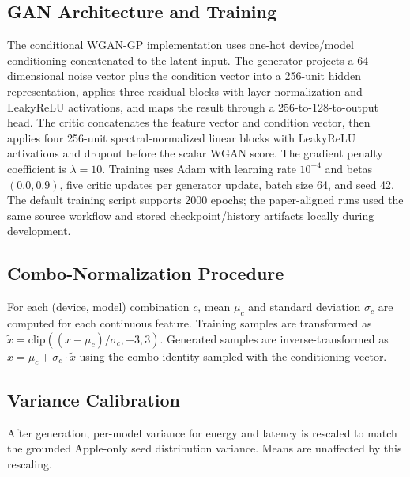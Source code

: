 \documentclass{svproc}
\begin{document}
\subsection{GAN Architecture and Training}
The conditional WGAN-GP implementation uses one-hot device/model conditioning
concatenated to the latent input. The generator projects a 64-dimensional noise
vector plus the condition vector into a 256-unit hidden representation, applies
three residual blocks with layer normalization and LeakyReLU activations, and
maps the result through a 256-to-128-to-output head. The critic concatenates
the feature vector and condition vector, then applies four 256-unit
spectral-normalized linear blocks with LeakyReLU activations and dropout before
the scalar WGAN score. The gradient penalty coefficient is $\lambda = 10$.
Training uses Adam with learning rate $10^{-4}$ and betas $(0.0, 0.9)$, five
critic updates per generator update, batch size 64, and seed 42. The default
training script supports 2000 epochs; the paper-aligned runs used the same
source workflow and stored checkpoint/history artifacts locally during
development.

\subsection{Combo-Normalization Procedure}
For each (device, model) combination $c$, mean $\mu_c$ and standard deviation
$\sigma_c$ are computed for each continuous feature. Training samples are
transformed as $\tilde{x} = \mathrm{clip}((x - \mu_c)/\sigma_c, -3, 3)$.
Generated samples are inverse-transformed as $x = \mu_c + \sigma_c \cdot \tilde{x}$
using the combo identity sampled with the conditioning vector.

\subsection{Variance Calibration}
After generation, per-model variance for energy and latency is rescaled to
match the grounded Apple-only seed distribution variance. Means are unaffected
by this rescaling.
\end{document}
